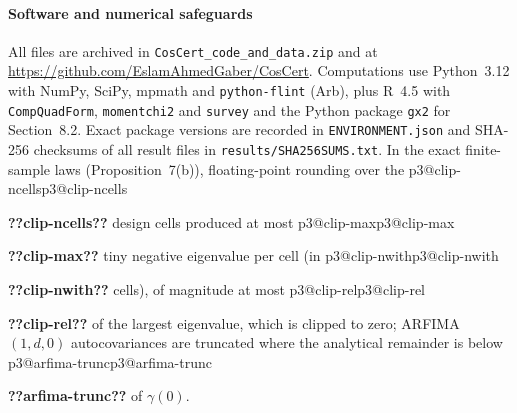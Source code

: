 \documentclass[final,3p,11pt]{elsarticle}
\makeatletter
\newcommand{\pthree}[1]{\ifcsname p3@#1\endcsname\csname p3@#1\endcsname\else
  \PackageError{p3numbers}{Undefined number key '#1'}{Run make_numbers.py}\textbf{??#1??}\fi}
\makeatother
\begin{document}
\begin{table}[tbp]\centering\footnotesize\setlength{\tabcolsep}{4pt}
\caption{Independent checks of numerical results by type of evidence.}\label{tab:reproduction}
%
\end{table}

\paragraph{Software and numerical safeguards} All files are archived in \texttt{CosCert\_code\_and\_data.zip} and at \url{https://github.com/EslamAhmedGaber/CosCert}. Computations use Python~3.12 with NumPy, SciPy, mpmath and \texttt{python-flint} (Arb), plus R~4.5 with \texttt{CompQuadForm}, \texttt{momentchi2} and \texttt{survey} and the Python package \texttt{gx2} for Section~8.2. Exact package versions are recorded in \texttt{ENVIRONMENT.json} and SHA-256 checksums of all result files in \texttt{results/SHA256SUMS.txt}. In the exact finite-sample laws (Proposition~7(b)), floating-point rounding over the \pthree{clip-ncells} design cells produced at most \pthree{clip-max} tiny negative eigenvalue per cell (in \pthree{clip-nwith} cells), of magnitude at most \pthree{clip-rel} of the largest eigenvalue, which is clipped to zero; ARFIMA$(1,d,0)$ autocovariances are truncated where the analytical remainder is below \pthree{arfima-trunc} of $\gamma(0)$.



\end{document}
